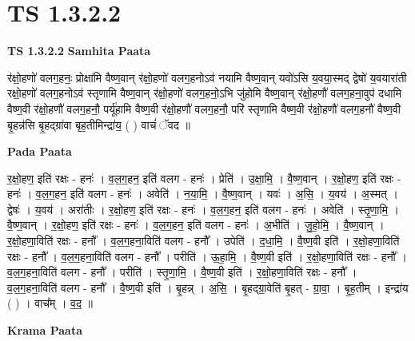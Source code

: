 \documentclass[17pt]{extarticle}
\begin{document}
\section*{ TS 1.3.2.2 }

\textbf{TS 1.3.2.2 } \newline
\textbf{Samhita Paata} \newline

र॑क्षो॒हणो॑ वलग॒हनः॒ प्रोक्षा॑मि वैष्ण॒वान् र॑क्षो॒हणो॑ वलग॒हनोऽव॑ नयामि वैष्ण॒वान् यवो॑ऽसि य॒वया॒स्मद् द्वेषो॑ य॒वयारा॑ती रक्षो॒हणो॑ वलग॒हनोऽव॑ स्तृणामि वैष्ण॒वान् र॑क्षो॒हणो॑ वलग॒हनो॒ऽभि जु॑होमि वैष्ण॒वान् र॑क्षो॒हणौ॑ वलग॒हना॒वुप॑ दधामि वैष्ण॒वी र॑क्षो॒हणौ॑ वलग॒हनौ॒ पर्यू॑हामि वैष्ण॒वी र॑क्षो॒हणौ॑ वलग॒हनौ॒ परि॑ स्तृणामि वैष्ण॒वी र॑क्षो॒हणौ॑ वलग॒हनौ॑ वैष्ण॒वी बृ॒हन्न॑सि बृ॒हद्ग्रा॑वा बृह॒तीमिन्द्रा॑य॒ ( ) वाचं॑ ॅवद ॥ \newline

\textbf{Pada Paata} \newline

र॒क्षो॒हण॒ इति॑ रक्षः - हनः॑ । व॒ल॒ग॒हन॒ इति॑ वलग - हनः॑ । प्रेति॑ । उ॒क्षा॒मि॒ । वै॒ष्ण॒वान् । र॒क्षो॒हण॒ इति॑ रक्षः - हनः॑ । व॒ल॒ग॒हन॒ इति॑ वलग - हनः॑ । अवेति॑ । न॒या॒मि॒ । वै॒ष्ण॒वान् । यवः॑ । अ॒सि॒ । य॒वय॑ । अ॒स्मत् । द्वेषः॑ । य॒वय॑ । अरा॑तीः । र॒क्षो॒हण॒ इति॑ रक्षः - हनः॑ । व॒ल॒ग॒हन॒ इति॑ वलग - हनः॑ । अवेति॑ । स्तृ॒णा॒मि॒ । वै॒ष्ण॒वान् । र॒क्षो॒हण॒ इति॑ रक्षः - हनः॑ । व॒ल॒ग॒हन॒ इति॑ वलग - हनः॑ । अ॒भीति॑ । जु॒हो॒मि॒ । वै॒ष्ण॒वान् । र॒क्षो॒हणा॒विति॑ रक्षः - हनौ᳚ । व॒ल॒ग॒हना॒विति॑ वलग - हनौ᳚ । उपेति॑ । द॒धा॒मि॒ । वै॒ष्ण॒वी इति॑ । र॒क्षो॒हणा॒विति॑ रक्षः - हनौ᳚ । व॒ल॒ग॒हना॒विति॑ वलग - हनौ᳚ । परीति॑ । ऊ॒हा॒मि॒ । वै॒ष्ण॒वी इति॑ । र॒क्षो॒हणा॒विति॑ रक्षः - हनौ᳚ । व॒ल॒ग॒हना॒विति॑ वलग - हनौ᳚ । परीति॑ । स्तृ॒णा॒मि॒ । वै॒ष्ण॒वी इति॑ । र॒क्षो॒हणा॒विति॑ रक्षः - हनौ᳚ । व॒ल॒ग॒हना॒विति॑ वलग - हनौ᳚ । वै॒ष्ण॒वी इति॑ । बृ॒हन्न् । अ॒सि॒ । बृ॒हद्ग्रा॒वेति॑ बृ॒हत् - ग्रा॒वा॒ । बृ॒ह॒तीम् । इन्द्रा॑य ( ) । वाच᳚म् । व॒द॒ ॥  \newline


\textbf{Krama Paata} \newline
\end{document}
